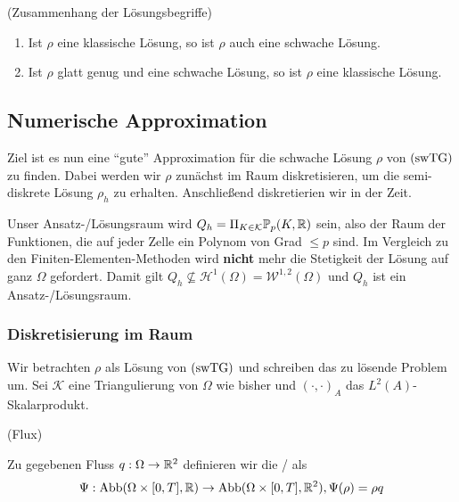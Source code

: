 \begin{Lemma}(Zusammenhang der Lösungsbegriffe)
	
	\begin{enumerate}
		\item Ist $ \rho $ eine klassische Lösung, so ist $ \rho $ auch eine schwache Lösung.
		\item Ist $ \rho $ glatt genug und eine schwache Lösung, so ist $ \rho $ eine klassische Lösung. 
	\end{enumerate}
\end{Lemma}



\subsection{Numerische Approximation}
Ziel ist es nun eine \enquote{gute} Approximation für die schwache Lösung $ \rho $ von $ \operatorname{(swTG)} $ zu finden. Dabei werden wir $ \rho $ zunächst im Raum diskretisieren,  um die semi-diskrete Lösung $ \rho_h $ zu erhalten. Anschließend diskretierien wir in der Zeit.

Unser  Ansatz-/Lösungsraum wird $Q_h = \Pi_{K \in \mathcal{K}}  \mathbb{P}_p(K,\mathbb{R}) $ sein, also der Raum der Funktionen, die auf jeder Zelle ein Polynom von Grad $ \leq p $ sind. Im Vergleich zu den Finiten-Elementen-Methoden wird \textbf{nicht} mehr die Stetigkeit der Lösung auf ganz $ \Omega $ gefordert. Damit gilt $ Q_h \not \subseteq \mathcal{H}^1(\Omega)=\mathcal{W}^{1,2}(\Omega) $ und $ Q_h $ ist ein  Ansatz-/Lösungsraum.

\subsubsection{Diskretisierung im Raum}
Wir betrachten $ \rho $ als Lösung von $ \operatorname{(swTG)} $ und schreiben das zu lösende Problem um. Sei $ \mathcal{K} $ eine Triangulierung von $ \Omega $ wie bisher und $ (\cdot,\cdot)_A $ das $ L^2(A) $-Skalarprodukt. 
\begin{define}(Flux)
	
	Zu gegebenen Fluss $ q:\Omega \to \mathbb{R}^2 $ definieren wir die / als
	\[ \Psi: \operatorname{Abb}(\Omega \times [0,T], \mathbb{R}) \to \operatorname{Abb}(\Omega \times [0,T], \mathbb{R}^2), \Psi(\rho) = \rho q \]
\end{define}

